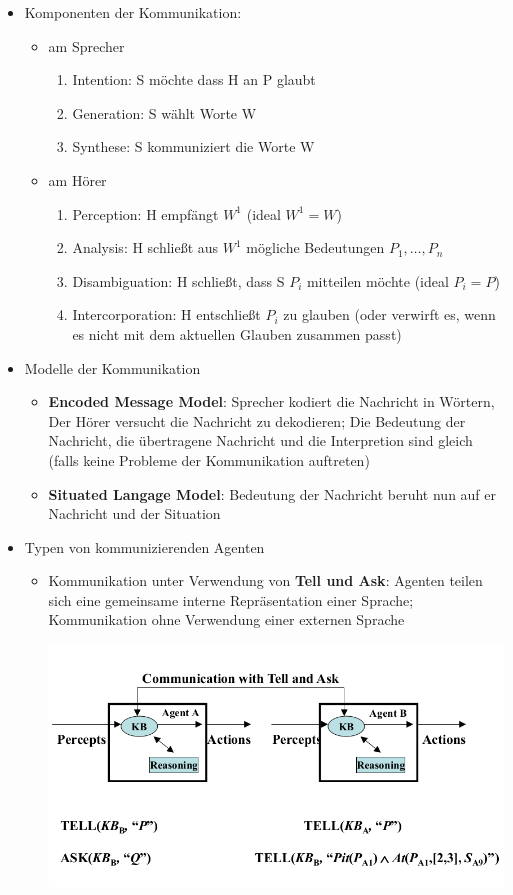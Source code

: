 \documentclass{article} %
\begin{document}
\begin{itemize}
		\item Komponenten der Kommunikation:
		\begin{itemize}
			\item am Sprecher
			\begin{enumerate}
				\item Intention: S möchte dass H an P glaubt
				\item Generation: S wählt Worte W
				\item Synthese: S kommuniziert die Worte W
			\end{enumerate}
			\item am Hörer
			\begin{enumerate}
				\item Perception: H empfängt $W^1$ (ideal $W^1 = W$)
				\item Analysis: H schließt aus $W^1$ mögliche Bedeutungen $P_1,\dots,P_n$
				\item Disambiguation: H schließt, dass S $P_i$ mitteilen möchte (ideal $P_i = P$)
				\item Intercorporation: H entschließt $P_i$ zu glauben (oder verwirft es, wenn es nicht mit dem aktuellen Glauben zusammen passt)
			\end{enumerate}
		\end{itemize}
		\item Modelle der Kommunikation
		\begin{itemize}
			\item \textbf{Encoded Message Model}: Sprecher kodiert die Nachricht in Wörtern, Der Hörer versucht die Nachricht zu dekodieren; Die Bedeutung der Nachricht, die übertragene Nachricht und die Interpretion sind gleich (falls keine Probleme der Kommunikation auftreten)
			\item \textbf{Situated Langage Model}: Bedeutung der Nachricht beruht nun auf er Nachricht und der Situation
		\end{itemize}
		\item Typen von kommunizierenden Agenten
		\begin{itemize}
			\item Kommunikation unter Verwendung von \textbf{Tell und Ask}: Agenten teilen sich eine gemeinsame interne Repräsentation einer Sprache; Kommunikation ohne Verwendung einer externen Sprache
			\begin{center}
				\includegraphics[scale=0.3]{img/tell and ask.png}

\end{center}
\end{itemize}
\end{itemize}
\end{document}
